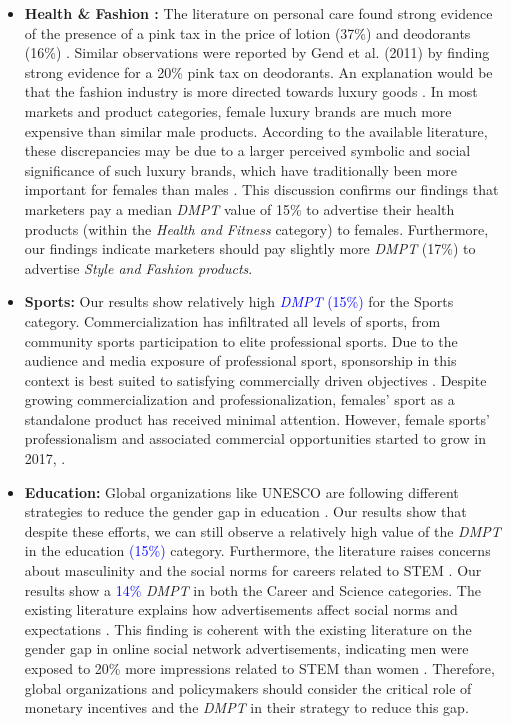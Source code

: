 \documentclass[twocolumn]{bmcart}\usepackage{lineno}
\begin{document}
\begin{itemize}
\item \textbf{ Health \& Fashion :} The literature on personal care found strong evidence of the presence of a pink tax in the price of lotion (37\%) and deodorants (16\%) \cite{guittar2022beyond}. Similar observations were reported by Gend et al. (2011) \cite{duesterhaus2011cost} by finding strong evidence for a 20\% pink tax on deodorants. 
An explanation would be that the fashion industry is more directed towards luxury goods \cite{mckinsey2023}. In most markets and product categories, female luxury brands are much more expensive than similar male products. According to the available literature, these discrepancies may be due to a larger perceived symbolic and social significance of such luxury brands, which have traditionally been more important for females than males \cite{stokburger2013luxury}. This discussion confirms our findings that marketers pay \color{blue}a median \emph{DMPT} value of 15\% to advertise their health products (within the \emph{Health and Fitness} category) to females. Furthermore, our findings indicate marketers should pay slightly more \emph{DMPT} (17\%) to advertise \emph{Style and Fashion products}.
\color{black}



\item \textbf{Sports:}
Our results show relatively high \textcolor{blue}{\emph{DMPT} (15\%)} for the Sports category. Commercialization has infiltrated all levels of sports, from community sports participation to elite professional sports. Due to the audience and media exposure of professional sport, sponsorship in this context is best suited to satisfying commercially driven objectives \cite{vance2016beyond}. Despite growing commercialization and professionalization, females' sport as a standalone product has received minimal attention. However, female sports' professionalism and associated commercial opportunities started to grow in 2017, \cite{morgan2019examination}.

\item \textbf{Education:}
Global organizations like UNESCO are following different strategies to reduce the gender gap in education \cite{unesco2019}. Our results show that despite these efforts, we can still observe a relatively high value of the \emph{DMPT} in the education \textcolor{blue}{(15\%)} category. Furthermore, the literature raises concerns about masculinity and the social norms for careers related to STEM \cite{beede2011women}. Our results show a \textcolor{blue}{14\%} \emph{DMPT} in both the Career and Science categories. The existing literature explains how advertisements affect social norms and expectations \cite{royne2021power}. This finding is coherent with the existing literature on the gender gap in online social network advertisements, indicating men were exposed to  20\% more impressions related to STEM than women \cite{lambrecht2019algorithmic}. Therefore, global organizations and policymakers should consider the critical role of monetary incentives and the \emph{DMPT} in their strategy to reduce this gap. 

\end{itemize}
\end{document}
